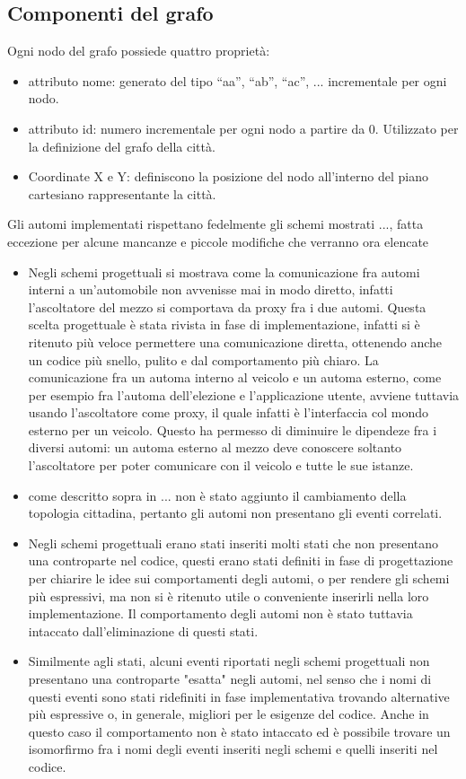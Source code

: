 \subsection{Componenti del grafo}
Ogni nodo del grafo possiede quattro proprietà:
\begin{itemize}
	\item attributo nome: generato del tipo ``aa'', ``ab'', ``ac'', ... incrementale per ogni nodo.
	\item attributo id: numero incrementale per ogni nodo a partire da 0. Utilizzato per la definizione del grafo della città.
	\item Coordinate X e Y: definiscono la posizione del nodo all'interno del piano cartesiano rappresentante la città.
\end{itemize}

Gli automi implementati rispettano fedelmente gli schemi mostrati ..., fatta eccezione per alcune mancanze e piccole modifiche che verranno ora elencate

\begin{itemize}
	\item Negli schemi progettuali si mostrava come la comunicazione fra automi interni a un'automobile non avvenisse mai in modo diretto, infatti l'ascoltatore del mezzo si comportava da proxy fra i due automi. Questa scelta progettuale è stata rivista in fase di implementazione, infatti si è ritenuto più veloce permettere una comunicazione diretta, ottenendo anche un codice più snello, pulito e dal comportamento più chiaro. 
	La comunicazione fra un automa interno al veicolo e un automa esterno, come per esempio fra l'automa dell'elezione e l'applicazione utente, avviene tuttavia usando l'ascoltatore come proxy, il quale infatti è l'interfaccia col mondo esterno per un veicolo. Questo ha permesso di diminuire le dipendeze fra i diversi automi: un automa esterno al mezzo deve conoscere soltanto l'ascoltatore per poter comunicare con il veicolo e tutte le sue istanze.
	\item come descritto sopra in ... non è stato aggiunto il cambiamento della topologia cittadina, pertanto gli automi non presentano gli eventi correlati.
	\item Negli schemi progettuali erano stati inseriti molti stati che non presentano una controparte nel codice, questi erano stati definiti in fase di progettazione per chiarire le idee sui comportamenti degli automi, o per rendere gli schemi più espressivi, ma non si è ritenuto utile o conveniente inserirli nella loro implementazione. Il comportamento degli automi non è stato tuttavia intaccato dall'eliminazione di questi stati. 
	\item Similmente agli stati, alcuni eventi riportati negli schemi progettuali non presentano una controparte "esatta" negli automi, nel senso che i nomi di questi eventi sono stati ridefiniti in fase implementativa trovando alternative più espressive o, in generale, migliori per le esigenze del codice. Anche in questo caso il comportamento non è stato intaccato ed è possibile trovare un isomorfirmo fra i nomi degli eventi inseriti negli schemi e quelli inseriti nel codice.
\end{itemize}

